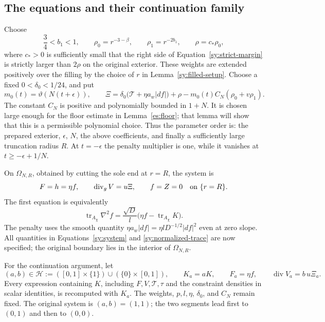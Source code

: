 \subsection{The equations and their continuation family}

Choose
\begin{equation}\label{sy:weights}
 \frac34<b_1<1,\qquad
 \rho_0=r^{-3-\beta},\qquad \rho_1=r^{-2b_1},\qquad
 \rho=c_*\rho_0,
\end{equation}
where $c_*>0$ is sufficiently small that the right side of
Equation~\ref{sy:strict-margin} is strictly larger than $2\rho$ on
the original exterior.  These weights are extended positively over
the filling by the choice of $r$ in Lemma~\ref{sy:filled-setup}.
Choose a fixed $0<\delta_0<1/24$, and put
\begin{equation}\label{sy:penalty}
 m_0(t)=\vartheta(N(t+\epsilon)),\qquad
 \Xi=\delta_0\bigl(\mathcal T+\eta a_w|df|\bigr)+\rho
                 -m_0(t)C_N(\rho_0+v\rho_1).
\end{equation}
The constant $C_N$ is positive and polynomially bounded in $1+N$.
It is chosen large enough for the floor estimate in
Lemma~\ref{es:floor}; that lemma will show that this is a permissible
polynomial choice.  Thus the parameter order is: the prepared
exterior, $\epsilon$, $N$, the above coefficients, and finally a
sufficiently large truncation radius $R$.  At $t=-\epsilon$ the
penalty multiplier is one, while it vanishes at
$t\ge-\epsilon+1/N$.

On $\Omega_{N,R}$, obtained by cutting the sole end at $r=R$, the
system is
\begin{equation}\label{sy:system}
 F=h=\eta f,\qquad
 \operatorname{div}_gV=u\Xi,
 \qquad f=Z=0\quad\hbox{on }\{r=R\}.
\end{equation}
The first equation is equivalently
\begin{equation}\label{sy:normalized-trace}
 \operatorname{tr}_{A_\chi}\nabla^2f
 =\frac{\sqrt D}{l}
       \bigl(\eta f-\operatorname{tr}_{A_\chi}K\bigr).
\end{equation}
The penalty uses the smooth quantity
$\eta a_w|df|=\eta lD^{-1/2}|df|^2$ even at zero slope.
All quantities in Equations~\ref{sy:system} and
\ref{sy:normalized-trace} are now specified; the original boundary
lies in the interior of $\Omega_{N,R}$.

For the continuation argument, let
\begin{equation}\label{sy:homotopy}
 (a,b)\in\mathcal H
 :=([0,1]\times\{1\})\cup(\{0\}\times[0,1]),
 \qquad K_a=aK,
 \qquad F_a=\eta f,
 \qquad \operatorname{div}V_a=b\,u\Xi_a.
\end{equation}
Every expression containing $K$, including $F,V,\mathcal T,\tau$
and the constraint densities in scalar identities, is recomputed
with $K_a$.  The weights, $p,l,\eta$, $\delta_0$, and $C_N$ remain
fixed.  The original system is $(a,b)=(1,1)$; the two segments lead
first to $(0,1)$ and then to $(0,0)$.

